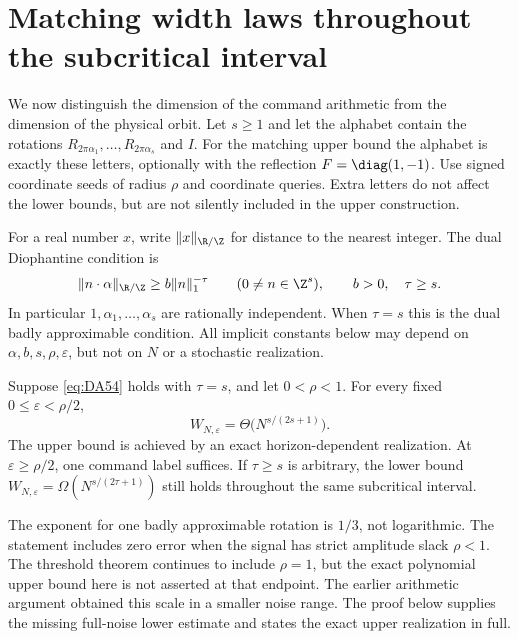 \section{Matching width laws throughout the subcritical interval}\label{sec:rates54}
We now distinguish the dimension of the command arithmetic from the dimension of the physical orbit. Let $s\ge1$ and let the alphabet contain the rotations $R_{2\pi\alpha_1},\ldots,R_{2\pi\alpha_s}$ and $I$. For the matching upper bound the alphabet is exactly these letters, optionally with the reflection $F=\diag(1,-1)$. Use signed coordinate seeds of radius $\rho$ and coordinate queries. Extra letters do not affect the lower bounds, but are not silently included in the upper construction.

For a real number $x$, write $\|x\|_{\R/\Z}$ for distance to the nearest integer. The dual Diophantine condition is
\begin{equation}\label{eq:DA54}
 \|n\cdot\alpha\|_{\R/\Z}\ge b\|n\|_1^{-\tau}
 \qquad(0\ne n\in\Z^s),\qquad b>0,\quad\tau\ge s.
\end{equation}
In particular $1,\alpha_1,\ldots,\alpha_s$ are rationally independent. When $\tau=s$ this is the dual badly approximable condition. All implicit constants below may depend on $\alpha,b,s,\rho,\varepsilon$, but not on $N$ or a stochastic realization.

\begin{theorem}\label{thm:matched54}
Suppose \eqref{eq:DA54} holds with $\tau=s$, and let $0<\rho<1$. For every fixed $0\le\varepsilon<\rho/2$,
\begin{equation}\label{eq:matched54}
                 W_{N,\varepsilon}=\Theta\bigl(N^{s/(2s+1)}\bigr).
\end{equation}
The upper bound is achieved by an exact horizon-dependent realization. At $\varepsilon\ge\rho/2$, one command label suffices. If $\tau\ge s$ is arbitrary, the lower bound $W_{N,\varepsilon}=\Omega(N^{s/(2\tau+1)})$ still holds throughout the same subcritical interval.
\end{theorem}
The exponent for one badly approximable rotation is $1/3$, not logarithmic. The statement includes zero error when the signal has strict amplitude slack $\rho<1$. The threshold theorem continues to include $\rho=1$, but the exact polynomial upper bound here is not asserted at that endpoint. The earlier arithmetic argument obtained this scale in a smaller noise range. The proof below supplies the missing full-noise lower estimate and states the exact upper realization in full.

